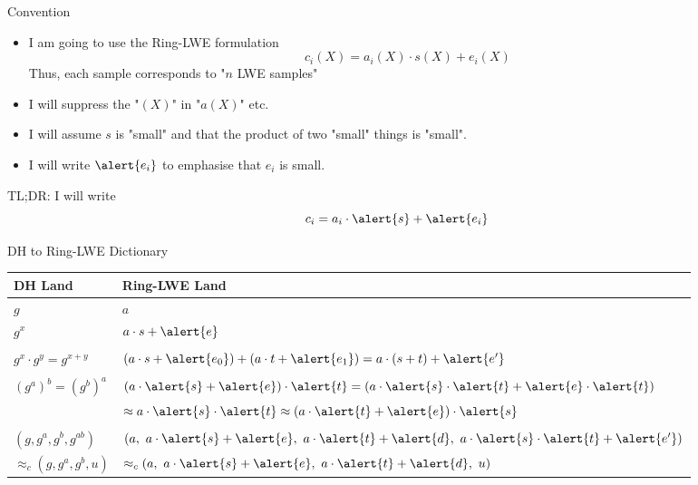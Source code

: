 \documentclass[xcolor=table,10pt,aspectratio=169]{beamer}
\begin{document}
\begin{frame}[label={sec:org79b5b8e}]{Convention}
\begin{itemize}
\item I am going to use the Ring-LWE formulation \[c_{i}(X) = a_{i}(X)\cdot s(X) + e_{i}(X)\]
Thus, each sample corresponds to "\(n\) LWE samples"
\item I will suppress the "\((X)\)" in "\(a(X)\)" etc.
\item I will assume \(s\) is "small" and that the product of two "small" things is "small".
\item I will write \(\alert{e_{i}}\) to emphasise that \(e_{i}\) is small.
\end{itemize}

\begin{block}{TL;DR: I will write}
\[c_{i} = a_{i}\cdot \alert{s} + \alert{e_{i}}\]
\end{block}
\end{frame}

\begin{frame}[label={sec:org58e405b}]{DH to Ring-LWE Dictionary}
\begin{center}
\begin{tabular}{ll}
DH Land & Ring-LWE Land\\
\hline
\(g\) & \(a\)\\
\(g^x\) & \(a\cdot {s} + \alert{e}\)\\
 & \\
\(g^x \cdot g^y = g^{x+y}\) & \((a\cdot {s} + \alert{e_0}) + (a \cdot {t} + \alert{e_1}) = a \cdot {(s+t)} + \alert{e'}\)\\
 & \\
\((g^a)^b = (g^b)^a\) & \((a\cdot \alert{s} + \alert{e})\cdot \alert{t} = (a\cdot \alert{s} \cdot \alert{t} + \alert{e} \cdot \alert{t})\)\\
 & \(\approx a\cdot \alert{s} \cdot \alert{t} \approx (a\cdot \alert{t} + \alert{e})\cdot \alert{s}\)\\
 & \\
\((g, g^a, g^b, g^{ab})\) & \((a,\ a\cdot \alert{s} + \alert{e},\ a\cdot \alert{t} + \alert{d},\ a \cdot \alert{s} \cdot \alert{t} + \alert{e'})\)\\
\(\approx_c (g, g^a, g^b, u)\) & \(\approx_c (a,\ a\cdot \alert{s} + \alert{e},\ a\cdot \alert{t} + \alert{d},\ u)\)\\
\end{tabular}

\end{center}
\end{frame}
\end{document}
